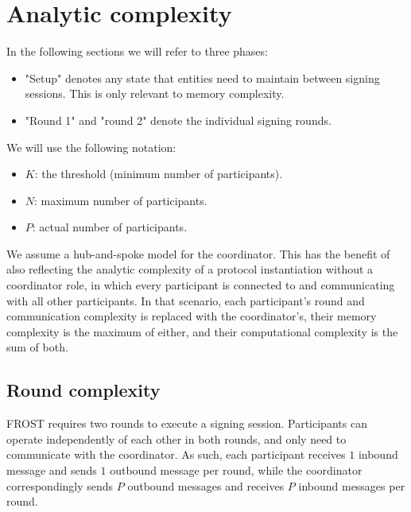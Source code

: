 
\section{Analytic complexity}\label{section:complexity}


In the following sections we will refer to three phases:
\begin{itemize}
	\item "Setup" denotes any state that entities need to maintain between
	signing sessions. This is only relevant to memory complexity.
	\item "Round 1" and "round 2" denote the individual signing rounds.
\end{itemize}

We will use the following notation:
\begin{itemize}
	\item $K$: the threshold (minimum number of participants).
	\item $N$: maximum number of participants.
	\item $P$: actual number of participants.
\end{itemize}

We assume a hub-and-spoke model for the coordinator. This has the benefit of
also reflecting the analytic complexity of a protocol instantiation without a
coordinator role, in which every participant is connected to and communicating
with all other participants. In that scenario, each participant's round and
communication complexity is replaced with the coordinator's, their memory
complexity is the maximum of either, and their computational complexity is the
sum of both.

\subsection{Round complexity}

FROST requires two rounds to execute a signing session. Participants can operate
independently of each other in both rounds, and only need to communicate with
the coordinator. As such, each participant receives $1$ inbound message and
sends $1$ outbound message per round, while the coordinator correspondingly
sends $P$ outbound messages and receives $P$ inbound messages per round.

